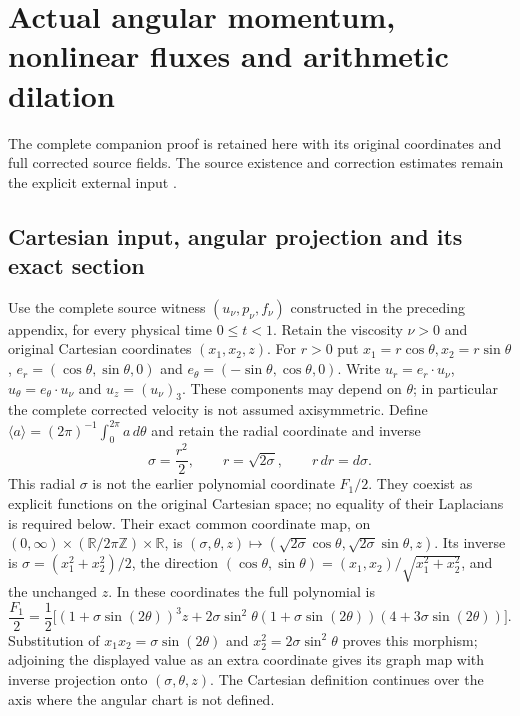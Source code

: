 \section{Actual angular momentum, nonlinear fluxes and arithmetic dilation}
\label{sec:cq-angular-physical-map}

The complete companion proof \cite{cqNSAngular} is retained here with its original coordinates and full corrected source fields. The source existence and correction estimates remain the explicit external input \cite{cqNS2026}.

\subsection{Cartesian input, angular projection and its exact section}

Use the complete source witness $(u_\nu,p_\nu,f_\nu)$ constructed in
the preceding appendix, for every physical time $0\leq t<1$. Retain
the viscosity $\nu>0$ and original Cartesian coordinates $(x_1,x_2,z)$.
For $r>0$ put $x_1=r\cos\theta,x_2=r\sin\theta$,
$e_r=(\cos\theta,\sin\theta,0)$ and
$e_\theta=(-\sin\theta,\cos\theta,0)$. Write
$u_r=e_r\cdot u_\nu$, $u_\theta=e_\theta\cdot u_\nu$ and
$u_z=(u_\nu)_3$. These components may depend on $\theta$; in particular
the complete corrected velocity is not assumed axisymmetric.
Define $\langle a\rangle=(2\pi)^{-1}\int_0^{2\pi}a\,d\theta$ and
retain the radial coordinate and inverse
\[
 \sigma=\frac{r^2}{2},\qquad r=\sqrt{2\sigma},\qquad
 r\,dr=d\sigma.
\]
This radial $\sigma$ is not the earlier polynomial coordinate $F_1/2$.
They coexist as explicit functions on the original Cartesian space;
no equality of their Laplacians is required below.
Their exact common coordinate map, on
$(0,\infty)\times(\mathbb R/2\pi\mathbb Z)\times\mathbb R$, is
$(\sigma,\theta,z)\mapsto
(\sqrt{2\sigma}\cos\theta,\sqrt{2\sigma}\sin\theta,z)$.
Its inverse is $\sigma=(x_1^2+x_2^2)/2$, the direction
$(\cos\theta,\sin\theta)=(x_1,x_2)/\sqrt{x_1^2+x_2^2}$,
and the unchanged $z$. In these coordinates the full polynomial is
\[
 \frac{F_1}{2}=\frac12\bigl[
 (1+\sigma\sin(2\theta))^3z
 +2\sigma\sin^2\theta(1+\sigma\sin(2\theta))
                         (4+3\sigma\sin(2\theta))\bigr].
\]
Substitution of $x_1x_2=\sigma\sin(2\theta)$ and
$x_2^2=2\sigma\sin^2\theta$ proves this morphism; adjoining the
displayed value as an extra coordinate gives its graph map with
inverse projection onto $(\sigma,\theta,z)$. The Cartesian definition
continues over the axis where the angular chart is not defined.

